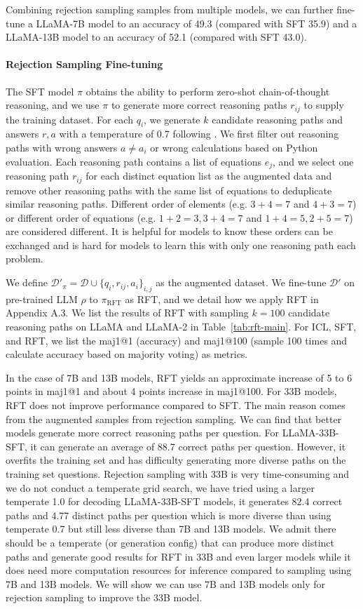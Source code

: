 Combining rejection sampling samples from multiple models, we can further fine-tune a LLaMA-7B model to an accuracy of 49.3 (compared with SFT 35.9) and a LLaMA-13B model to an accuracy of 52.1 (compared with SFT 43.0).

\paragraph{Rejection Sampling Fine-tuning} The SFT model $\pi$ obtains the ability to perform zero-shot chain-of-thought reasoning, and we use $\pi$ to generate more correct reasoning paths $r_{ij}$ to supply the training dataset. For each $q_i$, we generate $k$ candidate reasoning paths and answers $r,a$ with a temperature of 0.7 following \citep{gsm8k}. We first filter out reasoning paths with wrong answers $a\neq a_i$ or wrong calculations based on Python evaluation. Each reasoning path contains a list of equations $e_j$, and we select one reasoning path $r_{ij}$ for each distinct equation list as the augmented  data and remove other reasoning paths with the same list of equations to deduplicate similar reasoning paths. Different order of elements (e.g. $3+4=7$ and $4+3=7$) or different order of equations (e.g. $1+2=3, 3+4=7$ and $1+4=5, 2+5=7$) are considered different. It is helpful for models to know these orders can be exchanged and is hard for models to learn this with only one reasoning path each problem.

We define $\mathcal{D}'_{\pi} = \mathcal{D} \cup \{q_i,r_{ij},a_i\}_{i,j}$ as the augmented dataset. We fine-tune $\mathcal{D}'$ on pre-trained LLM $\rho$ to $\pi_\text{RFT}$ as RFT, and we detail how we apply RFT in Appendix A.3. We list the results of RFT with sampling $k=100$ candidate reasoning paths on LLaMA and LLaMA-2 in Table~\ref{tab:rft-main}. For ICL, SFT, and RFT, we list the maj1@1 (accuracy) and maj1@100 (sample 100 times and calculate accuracy based on majority voting) as metrics.

In the case of 7B and 13B models, RFT yields an approximate increase of 5 to 6 points in maj1@1 and about 4 points increase in maj1@100. For 33B models, RFT does not improve performance compared to SFT. The main reason comes from the augmented samples from rejection sampling. We can find that better models generate more correct reasoning paths per question. For LLaMA-33B-SFT, it can generate an average of 88.7 correct paths per question. However, it overfits the training set and has difficulty generating more diverse paths on the training set questions. Rejection sampling with 33B is very time-consuming and we do not conduct a temperate grid search, we have tried using a larger temperate 1.0 for decoding LLaMA-33B-SFT models, it generates 82.4 correct paths and 4.77 distinct paths per question which is more diverse than using temperate 0.7 but still less diverse than 7B and 13B models. We admit there should be a temperate (or generation config) that can produce more distinct paths and generate good results for RFT in 33B and even larger models while it does need more computation resources for inference compared to sampling using 7B and 13B models. We will show we can use 7B and 13B models only for rejection sampling to improve the 33B model.

